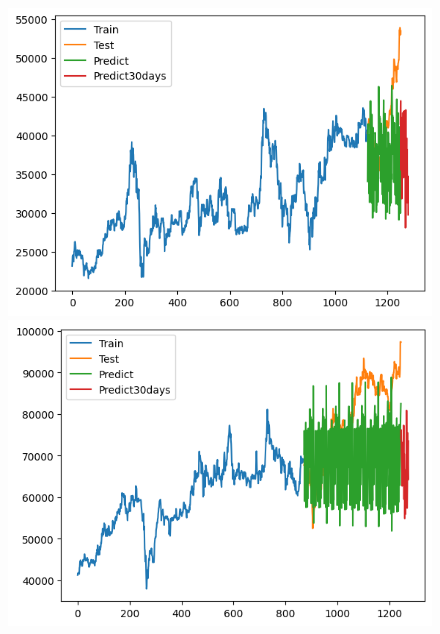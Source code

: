 \begin{figure}[H]
\begin{minipage}{0.15\textwidth}
    \end{minipage}
    \hfill
        \begin{minipage}{0.15\textwidth}
    \centering
    \includegraphics[width=1\textwidth]{resources/chapter-5/result/BIDV_ML_9_1.png}
    \end{minipage}
    \hfill
    \begin{minipage}{0.15\textwidth}
    \centering
    \includegraphics[width=1\textwidth]{resources/chapter-5/result/VCB_ML_7_3.png}
    \end{minipage}
    \hfill
    \begin{minipage}{0.15\textwidth}
    \centering

\end{minipage}
\end{figure}
